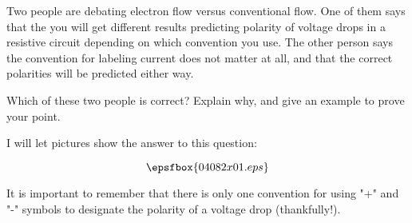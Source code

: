 

Two people are debating electron flow versus conventional flow.  One of them says that the you will get different results predicting polarity of voltage drops in a resistive circuit depending on which convention you use.  The other person says the convention for labeling current does not matter at all, and that the correct polarities will be predicted either way.

Which of these two people is correct?  Explain why, and give an example to prove your point.







I will let pictures show the answer to this question:

$$\epsfbox{04082x01.eps}$$







It is important to remember that there is only one convention for using "+" and "-" symbols to designate the polarity of a voltage drop (thankfully!).




